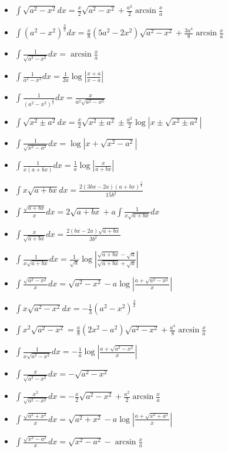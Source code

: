 \documentclass[12pt]{article}
\newcommand{\abs}[1]{\left\vert #1 \right\vert}
\begin{document}
\begin{multicols}{3}
\begin{itemize}
	\item $\int \sqrt{a^2 - x^2} dx = \frac{x}{2} \sqrt{a^2-x^2} +
		\frac{a^2}{2}\arcsin\frac{x}{a}$
	\item $\int (a^2 - x^2)^{\frac{3}{2}}dx = \frac{x}{8} (5a^2-2x^2)\sqrt{a^2-x^2}+
		\frac{3a^4}{8}\arcsin\frac{x}{a}$
	\item $\int \frac{1}{\sqrt{a^2 - x^2}}dx = \arcsin\frac{x}{a}$
	\item $\int \frac{1}{a^2 - x^2}dx = \frac{1}{2a} \log \abs{\frac{x+a}{x-a}}$
	\item $\int \frac{1}{(a^2 - x^2)^{\frac{3}{2}}}dx = \frac{x}{a^2\sqrt{a^2 - x^2}}$
	\item $\int \sqrt{x^2 \pm a^2}dx = \frac{x}{2} \sqrt{x^2 \pm a^2} \pm \frac{a^2}{2}
		\log \abs{x \pm \sqrt{x^2 \pm a^2}}$
	\item $\int \frac{1}{\sqrt{x^2 - a^2}}dx = \log \abs{x + \sqrt{x^2 - a^2}}$
	\item $\int \frac{1}{x(a+bx)}dx = \frac{1}{a}\log\abs{\frac{x}{a+bx}}$
	\item $\int x\sqrt{a+bx} dx =  \frac{2(3bx-2a)(a+bx)^{\frac{3}{2}}}{15b^2}$
	\item $\int \frac{\sqrt{a+bx}}{x}dx = 2\sqrt{a+bx} + a \int \frac{1}{x\sqrt{a+bx}}dx$
	\item $\int \frac{x}{\sqrt{a+bx}}dx = \frac{2(bx-2a)\sqrt{a+bx}}{3b^2}$
	\item $\int \frac{1}{x\sqrt{a+bx}}dx = \frac{1}{\sqrt{a}}
		\log \abs{\frac{\sqrt{a+bx} - \sqrt{a}}{\sqrt{a+bx} + \sqrt{a}}}$
	\item $\int \frac{\sqrt{a^2 - x^2}}{x}dx = \sqrt{a^2 - x^2} -
		a\log\abs{\frac{a+\sqrt{a^2 - x^2}}{x}}$
	\item $\int x\sqrt{a^2-x^2}dx = - \frac{1}{3}(a^2-x^2)^{\frac{3}{2}}$
	\item $\int x^2\sqrt{a^2 - x^2} = \frac{a}{8}(2x^2-a^2)\sqrt{a^2-x^2}+
		\frac{a^4}{8}\arcsin\frac{x}{a}$
	\item $\int \frac{1}{x\sqrt{a^2-x^2}}dx = - \frac{1}{a}\log\abs{\frac{a+
			\sqrt{a^2- x^2}}{x}}$
	\item $\int \frac{x}{\sqrt{a^2-x^2}}dx = -\sqrt{a^2-x^2}$
	\item $\int \frac{x^2}{\sqrt{a^2 - x^2}}dx = -\frac{x}{2}\sqrt{a^2-x^2}+\frac{a^2}{2}
		\arcsin\frac{x}{a}$
	\item $\int \frac{\sqrt{a^2+x^2}}{x}dx = \sqrt{a^2+x^2} - a
		\log \abs{\frac{a + \sqrt{x^2 + a^2}}{x}}$
	\item $\int \frac{\sqrt{x^2-a^2}}{x}dx = \sqrt{x^2-a^2}-\arcsin\frac{x}{a}$

\end{itemize}
\end{multicols}
\end{document}

